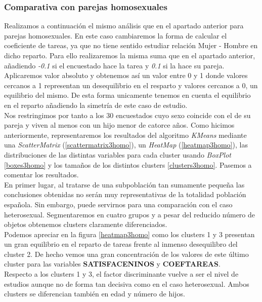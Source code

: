 \documentclass[11pt,a4paper]{article}
\begin{document}
	\subsubsection{Comparativa con parejas homosexuales}
	
	Realizamos a continuación el mismo análisis que en el apartado anterior para parejas homosexuales. En este caso cambiaremos la forma de calcular el coeficiente de tareas, ya que no tiene sentido estudiar relación Mujer - Hombre en dicho reparto. Para ello realizaremos la misma suma que en el apartado anterior, añadiendo \emph{-0.1} si el encuestado hace la tarea y \emph{0.1} si la hace su pareja. Aplicaremos valor absoluto y obtenemos así un valor entre 0 y 1 donde valores cercanos a 1 representan un desequilibrio en el resparto y valores cercanos a 0, un equilibrio del mismo. De esta forma unicamente tenemos en cuenta el equilibrio en el reparto añadiendo la simetría de este caso de estudio. \\
	
	Nos restringimos por tanto a los 30 encuestados cuyo sexo coincide con el de su pareja y viven al menos con un hijo menor de catorce años. Como hicimos anteriormente, representaremos los resultados del algoritmo \emph{KMeans} mediante una \emph{ScatterMatrix} (\ref{scattermatrix3homo}), un \emph{HeatMap} (\ref{heatmap3homo}), las distribuciones de las distintas variables para cada cluster usando \emph{BoxPlot} \ref{boxes3homo} y los tamaños de los distintos clusters \ref{clusters3homo}. Pasemos a comentar los resultados. \\
	
	En primer lugar, al tratarse de una subpoblación tan sumamente pequeña las conclusiones obtenidas no serán muy representativas de la totalidad población española. Sin embargo, puede servirnos para una comparación con el caso heterosexual. Segmentaremos en cuatro grupos y a pesar del reducido número de objetos obtenemos clusters claramente diferenciados. \\
	
	Podemos apreciar en la figura \ref{heatmap3homo} como los clusters 1 y 3 presentan un gran equilibrio en el reparto de tareas frente al inmenso desequilibro del cluster 2. De hecho vemos una gran concentración de los valores de este último cluster para las variables \textbf{SATISFACENINOS} y \textbf{COEFTAREAS}. \\
	
	Respecto a los clusters 1 y 3, el factor discriminante vuelve a ser el nivel de estudios aunque no de forma tan decisiva como en el caso heterosexual. Ambos clusters se diferencian también en edad y número de hijos. \\
	
\end{document}
